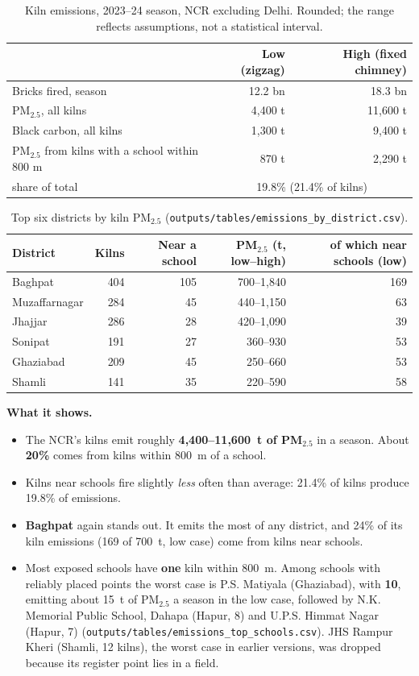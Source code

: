 \documentclass[11pt,a4paper]{article}
\begin{document}
\begin{table}[H]
\centering\small
\begin{tabular}{@{}lrr@{}}
\toprule
 & Low (zigzag) & High (fixed chimney) \\
\midrule
Bricks fired, season & 12.2 bn & 18.3 bn \\
PM$_{2.5}$, all kilns & 4,400 t & 11,600 t \\
Black carbon, all kilns & 1,300 t & 9,400 t \\
PM$_{2.5}$ from kilns with a school within 800 m & 870 t & 2,290 t \\
\quad share of total & \multicolumn{2}{c}{19.8\% (21.4\% of kilns)} \\
\bottomrule
\end{tabular}
\caption{Kiln emissions, 2023--24 season, NCR excluding Delhi. Rounded;
the range reflects assumptions, not a statistical interval.}
\label{tab:emissions}
\end{table}

\begin{table}[H]
\centering\small
\begin{tabular}{@{}lrrrr@{}}
\toprule
District & Kilns & Near a school & PM$_{2.5}$ (t, low--high) & of which near schools (low) \\
\midrule
Baghpat & 404 & 105 & 700--1,840 & 169 \\
Muzaffarnagar & 284 & 45 & 440--1,150 & 63 \\
Jhajjar & 286 & 28 & 420--1,090 & 39 \\
Sonipat & 191 & 27 & 360--930 & 53 \\
Ghaziabad & 209 & 45 & 250--660 & 53 \\
Shamli & 141 & 35 & 220--590 & 58 \\
\bottomrule
\end{tabular}
\caption{Top six districts by kiln PM$_{2.5}$
(\texttt{outputs/tables/emissions\_by\_district.csv}).}
\end{table}

\textbf{What it shows.}
\begin{itemize}[leftmargin=*]
\item The NCR's kilns emit roughly \textbf{4,400--11,600~t of PM$_{2.5}$} in
a season. About \textbf{20\%} comes from kilns within 800~m of a school.
\item Kilns near schools fire slightly \emph{less} often than average: 21.4\% of
kilns produce 19.8\% of emissions.
\item \textbf{Baghpat} again stands out. It emits the most of any district,
and 24\% of its kiln emissions (169 of 700~t, low case) come from kilns near
schools.
\item Most exposed schools have \textbf{one} kiln within 800~m. Among schools with
reliably placed points the worst case is P.S. Matiyala (Ghaziabad), with
\textbf{10}, emitting about 15~t of PM$_{2.5}$ a season in the low case, followed
by N.K. Memorial Public School, Dahapa (Hapur, 8) and U.P.S. Himmat Nagar (Hapur,
7) (\texttt{outputs/tables/emissions\_top\_schools.csv}). JHS Rampur Kheri
(Shamli, 12 kilns), the worst case in earlier versions, was dropped because its
register point lies in a field.
\end{itemize}
\end{document}
